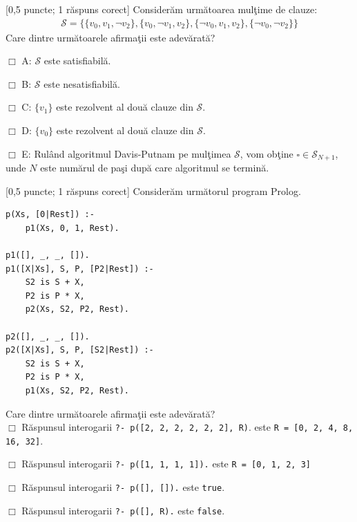 \documentclass[12pt]{article}
\newcommand{\probex}{\stepcounter{uebno}{\vspace{0.3cm}\noindent \bf (P\arabic{uebno}) }}
\newcommand{\solutiong}[1]{$\,$ \\ \begin{proof}\mbox{}\\#1 \qed \end{proof}}
\renewcommand{\boxtimes}{\Box}
\renewcommand{\solutiong}[1]{}
\begin{document}
\probex [0,5 puncte; 1 r\u{a}spuns corect] Consider\u{a}m urm\u atoarea mul\c time de clauze:
\begin{align*}
    \mathcal{S} = \{ \{v_0, v_1, \neg v_2\}, \{v_0, \neg v_1, v_2\}, \{\neg v_0, v_1, v_2\}, \{\neg v_0, \neg v_2\} \}
\end{align*}
Care dintre urm\u{a}toarele afirma\c{t}ii este adev\u{a}rat\u{a}?

$\boxtimes$ A: $\mathcal{S}$ este satisfiabil\u{a}. 

$\Box$ B: $\mathcal{S}$ este nesatisfiabil\u{a}. 

$\Box$ C: $\{v_1\}$ este rezolvent al dou\u{a} clauze din $\mathcal{S}$. 

$\Box$ D: $\{v_0\}$ este rezolvent al dou\u{a} clauze din $\mathcal{S}$. 


$\Box$ E: Rul\^{a}nd algoritmul Davis-Putnam pe mul\c{t}imea $\mathcal{S}$,
vom ob\c{t}ine $\square \in \mathcal{S}_{N + 1}$,
unde $N$ este num\u{a}rul de pa\c{s}i dup\u{a} care algoritmul se termin\u{a}. 


\solutiong{
    Se observ\u{a} c\u{a} o evaluare $e$ cu 
    $e(v_0) = e(v_1) = 1$ \c{s}i $e(v_2) = 0$ satisface $\mathcal{S}$. 
    Rezult\u{a} c\u{a} A este adev\u{a}rat\u{a} \c{s}i B, E sunt false.
    Se observ\u{a} c\u{a} $\{v_0\}$ \c{s}i $\{v_1\}$ nu se pot ob\c{t}ine ca rezolven\c{t}i din dou\u{a} clauze din $\mathcal{S}$.
}


\probex [0,5 puncte; 1 r\u{a}spuns corect]
Consider\u{a}m urm\u{a}torul program Prolog.
\begin{verbatim}
p(Xs, [0|Rest]) :-
    p1(Xs, 0, 1, Rest).

p1([], _, _, []).
p1([X|Xs], S, P, [P2|Rest]) :-
    S2 is S + X,
    P2 is P * X,
    p2(Xs, S2, P2, Rest). 

p2([], _, _, []).
p2([X|Xs], S, P, [S2|Rest]) :-
    S2 is S + X,
    P2 is P * X,
    p1(Xs, S2, P2, Rest). 
\end{verbatim}
Care dintre urm\u{a}toarele afirma\c{t}ii este adev\u{a}rat\u{a}? \\ 
$\Box$ R\u{a}spunsul interogarii \texttt{?- p([2, 2, 2, 2, 2, 2], R)}. este \texttt{R = [0, 2, 4, 8, 16, 32]}.

$\Box$ R\u{a}spunsul interogarii \texttt{?- p([1, 1, 1, 1]).} este \texttt{R = [0, 1, 2, 3]}

$\Box$ R\u{a}spunsul interogarii \texttt{?- p([], []).} este \texttt{true}.

$\Box$ R\u{a}spunsul interogarii \texttt{?- p([], R).} este \texttt{false}. 
\end{document}
